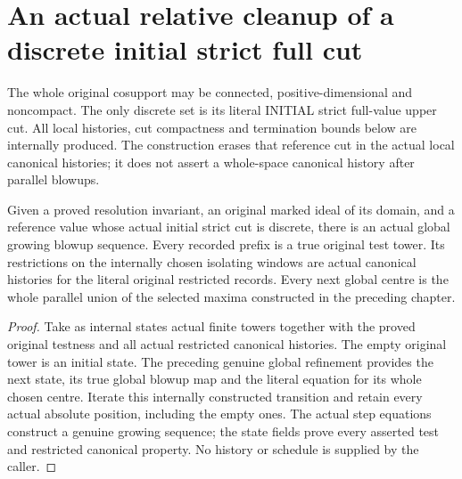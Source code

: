 \section{An actual relative cleanup of a discrete initial strict full cut}

The whole original cosupport may be connected, positive-dimensional and
noncompact. The only discrete set is its literal INITIAL strict full-value
upper cut. All local histories, cut compactness and termination bounds below
are internally produced. The construction erases that reference cut in the
actual local canonical histories; it does not assert a whole-space canonical
history after parallel blowups.

\begin{theorem}
\label{hir:original-discrete-full-cut-actual-history}
\leanok
Given a proved resolution invariant, an original marked ideal of its domain,
and a reference value whose actual initial strict cut is discrete, there is
an actual global growing blowup sequence. Every recorded prefix is a true
original test tower. Its restrictions on the internally chosen isolating
windows are actual canonical histories for the literal original restricted
records. Every next global centre is the whole parallel union of the
selected maxima constructed in the preceding chapter.
\end{theorem}
\begin{proof}
Take as internal states actual finite towers together with the proved
original testness and all actual restricted canonical histories. The empty
original tower is an initial state. The preceding genuine global refinement
provides the next state, its true global blowup map and the literal equation
for its whole chosen centre. Iterate this internally constructed transition
and retain every actual absolute position, including the empty ones. The
actual step equations construct a genuine growing sequence; the state
fields prove every asserted test and restricted canonical property.
No history or schedule is supplied by the caller.
\end{proof}

